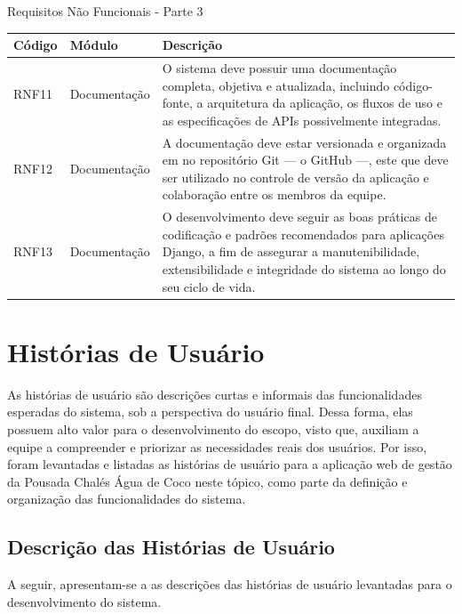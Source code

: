 \documentclass[
	12pt,				%
	openany,			%
	oneside,			%
	a4paper,			%
	english,			%
	french,				%
	spanish,			%
	brazil				%
	]{abntex2}
\begin{document}
\begin{quadro}[H]
	\caption{\label{quadro_rnf3}Requisitos Não Funcionais - Parte 3}
	\begin{tabular}{|>{\centering\arraybackslash}m{2cm}|>{\centering\arraybackslash}m{4cm}|>{\raggedright\arraybackslash}m{8cm}|}
		\hline
		\textbf{Código} & \textbf{Módulo} & \textbf{Descrição} \\ \hline
		RNF11 & Documentação & O sistema deve possuir uma documentação completa, objetiva e atualizada, incluindo código-fonte, a arquitetura da aplicação, os fluxos de uso e as especificações de APIs possivelmente integradas. \\ \hline
		RNF12 & Documentação & A documentação deve estar versionada e organizada em no repositório Git — o GitHub —, este que deve ser utilizado no controle de versão da aplicação e colaboração entre os membros da equipe. \\ \hline
		RNF13 & Documentação & O desenvolvimento deve seguir as boas práticas de codificação e padrões recomendados para aplicações Django, a fim de assegurar a manutenibilidade, extensibilidade e integridade do sistema ao longo do seu ciclo de vida. \\ \hline
	\end{tabular}
\end{quadro}
%
\section{Histórias de Usuário}
As histórias de usuário são descrições curtas e informais das funcionalidades esperadas do sistema, sob a perspectiva do usuário final. Dessa forma, elas possuem alto valor para o desenvolvimento do escopo, visto que, auxiliam a equipe a compreender e priorizar as necessidades reais dos usuários. Por isso, foram levantadas e listadas as histórias de usuário para a aplicação web de gestão da Pousada Chalés Água de Coco neste tópico, como parte da definição e organização das funcionalidades do sistema.
\subsection{Descrição das Histórias de Usuário}
A seguir, apresentam-se a as descrições das histórias de usuário levantadas para o desenvolvimento do sistema.
\end{document}
